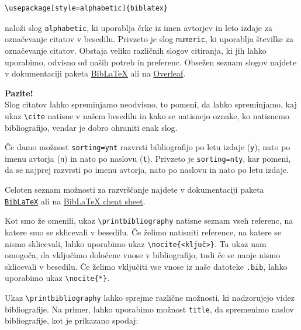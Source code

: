 \begin{verbatim}
\usepackage[style=alphabetic]{biblatex}
\end{verbatim}

naloži slog \texttt{alphabetic}, ki uporablja črke iz imen avtorjev in leto izdaje za označevanje citatov v besedilu. Privzeto je slog \texttt{numeric}, ki uporablja številke za označevanje citatov.
Obstaja veliko različnih slogov citiranja, ki jih lahko uporabimo, odvisno od naših potreb in preferenc.
Obsežen seznam slogov najdete v dokumentaciji paketa \href{https://ctan.org/pkg/biblatex?lang=en}{BibLaTeX} ali na \href{https://www.overleaf.com/learn/latex/Biblatex\_bibliography\_styles}{Overleaf}.

\begin{framed}
\textbf{Pazite!}\\
Slog citatov lahko spreminjamo neodvisno, to pomeni, da lahko spreminjamo, kaj ukaz \texttt{{\textbackslash}cite} natisne v našem besedilu in kako se natisnejo oznake, ko natisnemo bibliografijo, vendar je dobro ohraniti enak slog.
\end{framed}

Če damo možnost \texttt{sorting=ynt} razvrsti bibliografijo po letu izdaje (\texttt{y}), nato po imenu avtorja (\texttt{n}) in nato po naslovu (\texttt{t}). Privzeto je \texttt{sorting=nty}, kar pomeni, da se najprej razvrsti po imenu avtorja, nato po naslovu in nato po letu izdaje.

Celoten seznam možnosti za razvrščanje najdete v dokumentaciji paketa \href{https://ctan.org/pkg/biblatex?lang=en}{\texttt{BibLaTeX}} ali na \href{https://tug.org/biblatex-cheatsheet/biblatex-cheatsheet.pdf}{BibLaTeX cheat sheet}.

Kot smo že omenili, ukaz \texttt{{\textbackslash}printbibliography} natisne seznam vseh referenc, na katere smo se sklicevali v besedilu.
Če želimo natisniti reference, na katere se nismo sklicevali, lahko uporabimo ukaz \texttt{{\textbackslash}nocite\{\textless ključ\textgreater \}}.
Ta ukaz nam omogoča, da vključimo določene vnose v bibliografijo, tudi če se nanje nismo sklicevali v besedilu.
Če želimo vključiti vse vnose iz naše datoteke \texttt{.bib}, lahko uporabimo ukaz \texttt{{\textbackslash}nocite\{*\}}.

Ukaz \texttt{{\textbackslash}printbibliography} lahko sprejme različne možnosti, ki nadzorujejo videz bibliografije.
Na primer, lahko uporabimo možnost \texttt{title}, da spremenimo naslov bibliografije, kot je prikazano spodaj:

